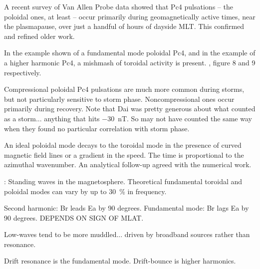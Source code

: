 A recent survey of Van Allen Probe data showed that Pc4 pulsations -- the poloidal ones, at least -- occur primarily during geomagnetically active times, near the plasmapause, over just a handful of hours of dayside MLT\cite{dai_2015}. This confirmed and refined older work\cite{engebretson_1987}. 

In the example shown of a fundamental mode poloidal Pc4, and in the example of a higher harmonic Pc4, a mishmash of toroidal activity is present. \cite{dai_2015}, figure 8 and 9 respectively. 

Compressional poloidal Pc4 pulsations are much more common during storms, but not particularly sensitive to storm phase. Noncompressional ones occur primarily during recovery\cite{dai_2015,rostoker_1979,engebretson_1992,anderson_1994}. Note that Dai\cite{dai_2015} was pretty generous about what counted as a storm... anything that hits \SI{-30}{\nano\tesla}. So \cite{motoba_2015} may not have counted the same way when they found no particular correlation with storm phase. 

An ideal poloidal mode decays to the toroidal mode in the presence of curved magnetic field lines\cite{radoski_1974} or a gradient in the \Alfven speed\cite{mann_1995}. The time is proportional to the azimuthal wavenumber\cite{mann_1995}. An analytical follow-up agreed with the numerical work\cite{mann_1997}. 


\cite{cummings_1969}: Standing \Alfven waves in the magnetosphere. Theoretical fundamental toroidal and poloidal modes can vary by up to \SI{30}{\percent} in frequency. 

Second harmonic: Br leads Ea by 90 degrees. Fundamental mode: Br lags Ea by 90 degrees. DEPENDS ON SIGN OF MLAT. \cite{dai_2015}

Low-\azm waves tend to be more muddled... driven by broadband sources rather than resonance\cite{dai_2015}. 

Drift resonance is the fundamental mode. Drift-bounce is higher harmonics\cite{dai_2015}. 

